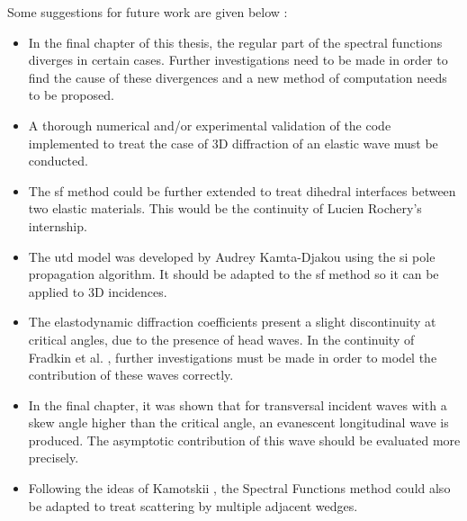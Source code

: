 Some suggestions for future work are given below :
\begin{itemize}
\item In the final chapter of this thesis, the regular part of the spectral functions diverges in certain cases. Further investigations need to be made in order to find the cause of these divergences and a new method of computation needs to be proposed.
\item A thorough numerical and/or experimental validation of the code implemented to treat the case of 3D diffraction of an elastic wave must be conducted.
\item The \acrlong{sf} method could be further extended to treat dihedral interfaces between two elastic materials. This would be the continuity of Lucien Rochery's internship.
\item The \acrshort{utd} model was developed by Audrey Kamta-Djakou \cite{AKDthese} using the \acrfull{si} pole propagation algorithm. It should be adapted to the \acrshort{sf} method so it can be applied to 3D incidences.
\item The elastodynamic diffraction coefficients present a slight discontinuity at critical angles, due to the presence of head waves. In the continuity of Fradkin et al. \cite{FradkinDarmon}, further investigations must be made in order to model the contribution of these waves correctly.
\item In the final chapter, it was shown that for transversal incident waves with a skew angle higher than the critical angle, an evanescent longitudinal wave is produced. The asymptotic contribution of this wave should be evaluated more precisely.
\item Following the ideas of Kamotskii \cite{Kamotski2}, the Spectral Functions method could also be adapted to treat scattering by multiple adjacent wedges.
\end{itemize}